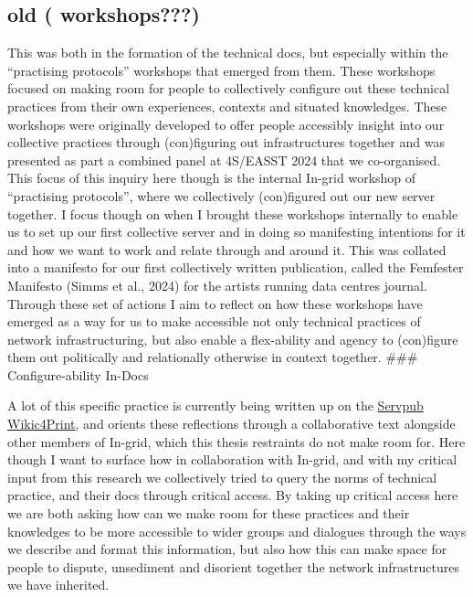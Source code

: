 \hypertarget{old-workshops}{%
\subsection{old ( workshops???)}\label{old-workshops}}

This was both in the formation of the technical docs, but especially
within the ``practising protocols'' workshops that emerged from them.
These workshops focused on making room for people to collectively
configure out these technical practices from their own experiences,
contexts and situated knowledges. These workshops were originally
developed to offer people accessibly insight into our collective
practices through (con)figuring out infrastructures together and was
presented as part a combined panel at 4S/EASST 2024 that we
co-organised. This focus of this inquiry here though is the internal
In-grid workshop of ``practising protocols'', where we collectively
(con)figured out our new server together. I focus though on when I
brought these workshops internally to enable us to set up our first
collective server and in doing so manifesting intentions for it and how
we want to work and relate through and around it. This was collated into
a manifesto for our first collectively written publication, called the
Femfester Manifesto (Simms et al., 2024) for the artists running data
centres journal. Through these set of actions I aim to reflect on how
these workshops have emerged as a way for us to make accessible not only
technical practices of network infrastructuring, but also enable a
flex-ability and agency to (con)figure them out politically and
relationally otherwise in context together. \#\#\# Configure-ability
In-Docs

A lot of this specific practice is currently being written up on the
\href{https://wiki4print.servpub.net/index.php?title=Chapter_3:_Praxis_Doubling}{Servpub
Wikic4Print}, and orients these reflections through a collaborative text
alongside other members of In-grid, which this thesis restraints do not
make room for. Here though I want to surface how in collaboration with
In-grid, and with my critical input from this research we collectively
tried to query the norms of technical practice, and their docs through
critical access. By taking up critical access here we are both asking
how can we make room for these practices and their knowledges to be more
accessible to wider groups and dialogues through the ways we describe
and format this information, but also how this can make space for people
to dispute, unsediment and disorient together the network
infrastructures we have inherited.

